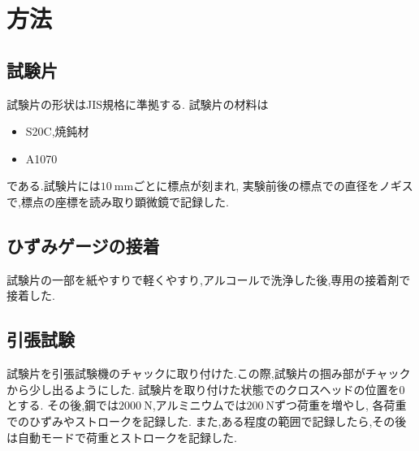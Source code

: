 \section{方法}
\subsection{試験片}
試験片の形状はJIS規格に準拠する.
試験片の材料は
\begin{itemize}
  \item S20C,焼鈍材
  \item A1070
\end{itemize}
である.試験片には$10~\si{\milli\metre}$ごとに標点が刻まれ,
実験前後の標点での直径をノギスで,標点の座標を読み取り顕微鏡で記録した.
\subsection{ひずみゲージの接着}
試験片の一部を紙やすりで軽くやすり,アルコールで洗浄した後,専用の接着剤で接着した.
\subsection{引張試験}
試験片を引張試験機のチャックに取り付けた.この際,試験片の掴み部がチャックから少し出るようにした.
試験片を取り付けた状態でのクロスヘッドの位置を0とする.
その後,鋼では$2000~\si{\newton}$,アルミニウムでは$200~\si{\newton}$ずつ荷重を増やし,
各荷重でのひずみやストロークを記録した.
また,ある程度の範囲で記録したら,その後は自動モードで荷重とストロークを記録した.